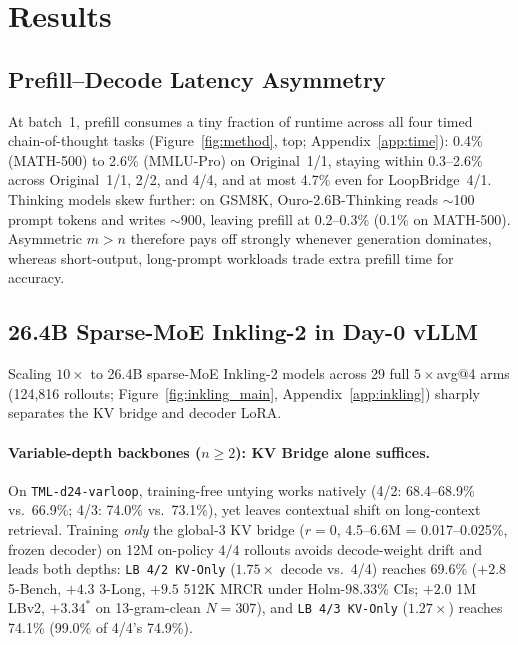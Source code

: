 \documentclass[11pt]{article}
\begin{document}
\section{Results}
\label{sec:results}

\subsection{Prefill--Decode Latency Asymmetry}
\label{sec:time}

At batch~1, prefill consumes a tiny fraction of runtime across all four timed chain-of-thought tasks
(Figure~\ref{fig:method}, top; Appendix~\ref{app:time}): 0.4\% (MATH-500) to 2.6\% (MMLU-Pro) on Original~1/1, staying
within 0.3--2.6\% across Original~1/1, 2/2, and 4/4, and at most 4.7\% even for LoopBridge~4/1. Thinking models skew
further: on GSM8K, Ouro-2.6B-Thinking reads $\sim$100 prompt tokens and writes $\sim$900, leaving prefill at 0.2--0.3\%
(0.1\% on MATH-500). Asymmetric $m{>}n$ therefore pays off strongly whenever generation dominates, whereas short-output,
long-prompt workloads trade extra prefill time for accuracy.

\subsection{26.4B Sparse-MoE Inkling-2 in Day-0 vLLM}
\label{sec:inkling_main}

Scaling $10\times$ to 26.4B sparse-MoE Inkling-2 models across 29 full $5\times$avg@4 arms (124,816 rollouts;
Figure~\ref{fig:inkling_main}, Appendix~\ref{app:inkling}) sharply separates the KV bridge and decoder LoRA.

\paragraph{Variable-depth backbones ($n{\ge}2$): KV Bridge alone suffices.}
On \texttt{TML-d24-varloop}, training-free untying works natively (4/2: 68.4--68.9\% vs.\ 66.9\%; 4/3: 74.0\% vs.\
73.1\%), yet leaves contextual shift on long-context retrieval. Training \emph{only} the global-3 KV bridge ($r{=}0$,
4.5--6.6M = 0.017--0.025\%, frozen decoder) on 12M on-policy $4/4$ rollouts avoids decode-weight drift and leads both
depths: \texttt{LB~4/2~KV-Only} ($1.75\times$ decode vs.\ 4/4) reaches 69.6\% ($+2.8$ 5-Bench, $+4.3$ 3-Long, $+9.5$
512K MRCR under Holm-98.33\% CIs; $+2.0$ 1M LBv2, $+3.34^\ast$ on 13-gram-clean $N{=}307$), and \texttt{LB~4/3~KV-Only}
($1.27\times$) reaches 74.1\% (99.0\% of 4/4's 74.9\%).
\end{document}
